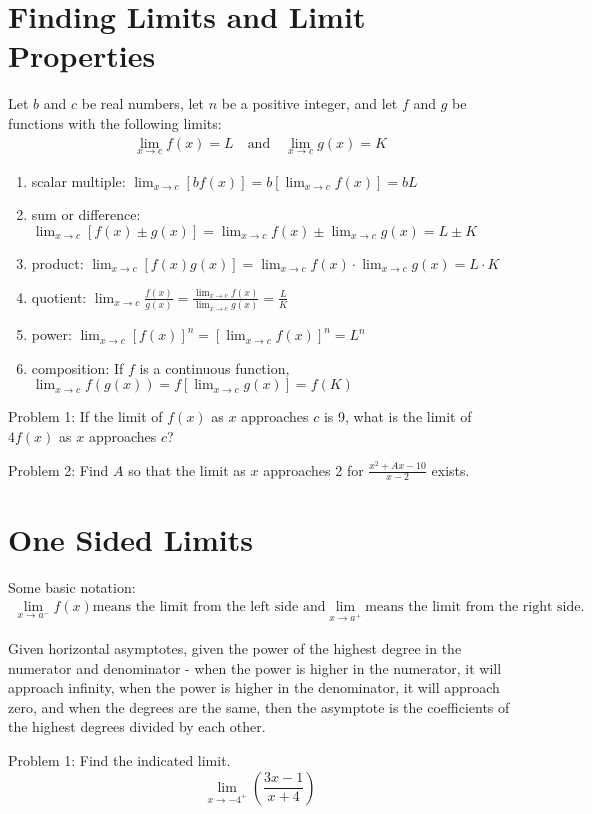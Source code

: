 \documentclass[../abcalc.tex]{subfiles}
\begin{document}
\section{Finding Limits and Limit Properties}
Let $b$ and $c$ be real numbers, let $n$ be a positive integer, and let $f$ and $g$ be functions with the following limits:
\begin{align*}
\lim_{x\to c}f(x)=L \quad \text{and} \quad \lim_{x\to c}g(x)=K
\end{align*}
\begin{enumerate}
    \item scalar multiple: $\lim_{x\to c}[bf(x)]=b[\lim_{x\to c}f(x)]=bL$
    \item sum or difference: $\lim_{x\to c}[f(x)\pm g(x)]=\lim_{x\to c}f(x)\pm \lim_{x\to c}g(x)=L\pm K$
    \item product: $\lim_{x\to c}[f(x)g(x)]=\lim_{x\to c}f(x)\cdot \lim_{x\to c}g(x)=L\cdot K$
    \item quotient: $\lim_{x\to c}\frac{f(x)}{g(x)}=\frac{\lim_{x\to c}f(x)}{\lim_{x\to c}g(x)}=\frac{L}{K}$
    \item power: $\lim_{x\to c}[f(x)]^n = [\lim_{x\to c}f(x)]^n = L^n$
    \item composition: If $f$ is a continuous function, $\lim_{x\to c}f(g(x))=f[\lim_{x\to c}g(x)]=f(K)$
\end{enumerate}

Problem 1: If the limit of $f(x)$ as $x$ approaches $c$ is 9, what is the limit of $4f(x)$ as $x$ approaches $c$?

Problem 2: Find $A$ so that the limit as $x$ approaches 2 for $\frac{x^2+Ax-10}{x-2}$ exists.
\section{One Sided Limits}
Some basic notation:
\begin{align*}
    \lim_{x\to a^-}f(x) \text{means the limit from the left side and} \lim_{x\to a^+} \text{means the limit from the right side.}
\end{align*}

Given horizontal asymptotes, given the power of the highest degree in the numerator and denominator - when the power is higher in the numerator, it will approach infinity, when the power is higher in the 
denominator, it will approach zero, and when the degrees are the same, then the asymptote is the coefficients of the highest degrees divided by each other.

Problem 1: Find the indicated limit.
\[\lim_{x\to -4^+}\left(\frac{3x-1}{x+4}\right)\]
\end{document}
